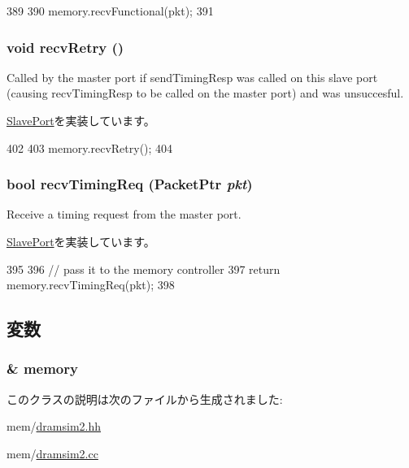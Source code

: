 \begin{DoxyCode}
389 {
390     memory.recvFunctional(pkt);
391 }
\end{DoxyCode}
\hypertarget{classDRAMSim2_1_1MemoryPort_a29cb5a4f98063ce6e9210eacbdb35298}{
\subsubsection[{recvRetry}]{\setlength{\rightskip}{0pt plus 5cm}void recvRetry ()}}
\label{classDRAMSim2_1_1MemoryPort_a29cb5a4f98063ce6e9210eacbdb35298}
Called by the master port if sendTimingResp was called on this slave port (causing recvTimingResp to be called on the master port) and was unsuccesful. 

\hyperlink{classSlavePort_ac1ccc3bcf7ebabb20b57fab99b2be5b0}{SlavePort}を実装しています。


\begin{DoxyCode}
402 {
403     memory.recvRetry();
404 }
\end{DoxyCode}
\hypertarget{classDRAMSim2_1_1MemoryPort_a3344d9dd0f83257feab5424e761f31c6}{
\subsubsection[{recvTimingReq}]{\setlength{\rightskip}{0pt plus 5cm}bool recvTimingReq ({\bf PacketPtr} {\em pkt})}}
\label{classDRAMSim2_1_1MemoryPort_a3344d9dd0f83257feab5424e761f31c6}
Receive a timing request from the master port. 

\hyperlink{classSlavePort_abcece77e42f88ee41af8d3d01bb48253}{SlavePort}を実装しています。


\begin{DoxyCode}
395 {
396     // pass it to the memory controller
397     return memory.recvTimingReq(pkt);
398 }
\end{DoxyCode}


\subsection{変数}
\hypertarget{classDRAMSim2_1_1MemoryPort_a9ad6c7bb088fd34b551f1b2653632a6c}{
\subsubsection[{memory}]{\& {\bf memory}}}
\label{classDRAMSim2_1_1MemoryPort_a9ad6c7bb088fd34b551f1b2653632a6c}


このクラスの説明は次のファイルから生成されました:\begin{DoxyCompactItemize}
\item 
mem/\hyperlink{dramsim2_8hh}{dramsim2.hh}\item 
mem/\hyperlink{dramsim2_8cc}{dramsim2.cc}\end{DoxyCompactItemize}
